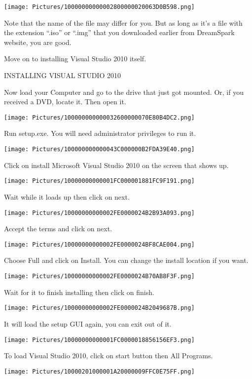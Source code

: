 \documentclass[
]{article}
\begin{document}
\texttt{[image: Pictures/10000000000002800000020063D0B598.png]}

Note that the name of the file may differ for you. But as long as it's a
file with the extension ``.iso'' or ``.img'' that you downloaded earlier
from DreamSpark website, you are good.

Move on to installing Visual Studio 2010 itself.

INSTALLING VISUAL STUDIO 2010

Now load your Computer and go to the drive that just got mounted. Or, if
you received a DVD, locate it. Then open it.

\texttt{[image: Pictures/100000000000032600000070E80B4DC2.png]}

Run setup.exe. You will need administrator privileges to run it.

\texttt{[image: Pictures/100000000000043C000000B2FDA39E40.png]}

Click on install Microsoft Visual Studio 2010 on the screen that shows
up.

\texttt{[image: Pictures/10000000000001FC000001881FC9F191.png]}

Wait while it loads up then click on next.

\texttt{[image: Pictures/10000000000002FE0000024B2B93A093.png]}

Accept the terms and click on next.

\texttt{[image: Pictures/10000000000002FE0000024BF8CAE004.png]}

Choose Full and click on Install. You can change the install location if
you want.

\texttt{[image: Pictures/10000000000002FE0000024B70AB8F3F.png]}

Wait for it to finish installing then click on finish.

\texttt{[image: Pictures/10000000000002FE0000024B2049687B.png]}

It will load the setup GUI again, you can exit out of it.

\texttt{[image: Pictures/10000000000001FC0000018856156EF3.png]}

To load Visual Studio 2010, click on start button then All Programs.

\texttt{[image: Pictures/10000201000001A20000009FFC0E75FF.png]}
\end{document}
